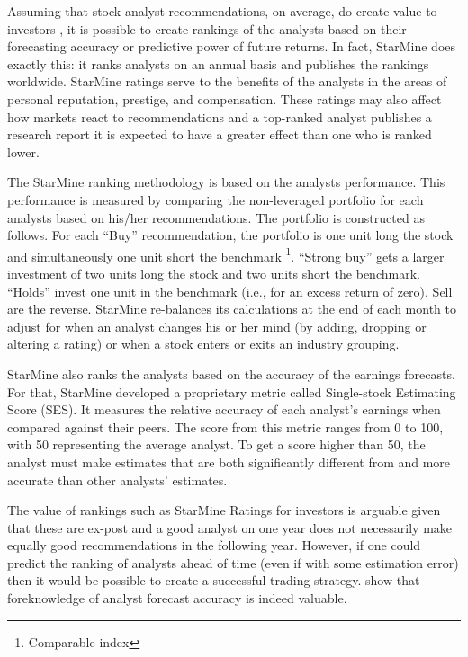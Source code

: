\documentclass{article}\usepackage[]{graphicx}\usepackage[]{color}
\begin{document}
Assuming that stock analyst recommendations, on average, do create value to investors \citep{womack1996,barber2001}, it is possible to create rankings of the analysts based on their forecasting accuracy or predictive power of future returns. In fact, StarMine\textsuperscript{\textregistered}
does exactly this: it ranks analysts on an annual basis and publishes the rankings worldwide. 
StarMine ratings serve to the benefits of the analysts in the areas of personal reputation, prestige, and compensation. These ratings may also affect how markets react to recommendations and a top-ranked analyst publishes a research report it is expected to have a greater effect than one who is ranked lower. 

The StarMine ranking methodology is based on the analysts performance. This performance is measured by comparing the non-leveraged portfolio for each analysts based on his/her recommendations. The portfolio is constructed as follows. For each ``Buy'' recommendation, the portfolio is one unit long the stock and simultaneously one unit short the benchmark \footnote{Comparable index}. ``Strong buy'' gets a larger investment of two units long the stock and two units short the benchmark. ``Holds'' invest one unit in the benchmark (i.e., for an excess return of zero). Sell are the reverse. StarMine re-balances its calculations at the end of each month to adjust for when an analyst changes his or her mind (by adding, dropping or altering a rating) or when a stock enters or exits an industry grouping. 

StarMine also ranks the analysts based on the accuracy of the earnings forecasts. For that, StarMine developed a proprietary metric called Single-stock Estimating Score (SES). It measures the relative accuracy of each analyst's earnings when compared against their peers. 
The score from this metric ranges from 0 to 100, with 50 representing the average analyst. To get a score higher than 50, the analyst must make estimates that are both significantly different from and more accurate than other analysts' estimates. 

The value of rankings such as StarMine Ratings for investors is arguable given that these are ex-post and a good analyst on one year does not necessarily make equally good recommendations in the following year. However, if one could predict the ranking of analysts ahead of time (even if with some estimation error) then it would be possible to create a successful trading strategy. \cite{brown2003} show that foreknowledge of analyst forecast accuracy is indeed valuable.
\end{document}
